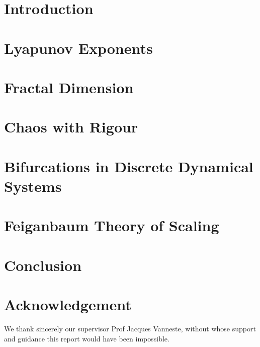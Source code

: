 \documentclass[12pt,oneside]{report}
\begin{document}
\maketitle


\declaration
\dedication{Musa mihi causas memora ...\\
	Muse, tell me the cause ...
}

\tableofcontents
\newpage
{}

\chapter*{Introduction}


\chapter{Lyapunov Exponents}

\chapter{Fractal Dimension}


\chapter{Chaos with Rigour}\label{chapter:chaos_with_rigor}


\chapter{Bifurcations in Discrete Dynamical Systems}\label{chapter:bifurcation}


\chapter{Feiganbaum Theory of Scaling}



\chapter*{Conclusion}


\chapter*{Acknowledgement}
We thank sincerely our supervisor Prof Jacques Vanneste, without whose support and guidance this report would have been impossible.
\end{document}
